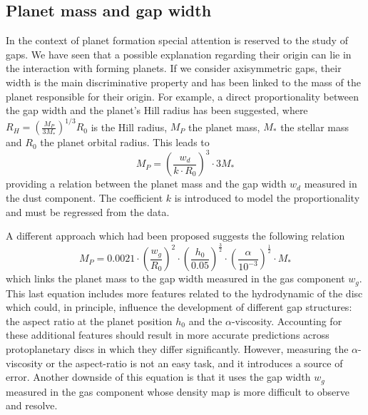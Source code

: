 \documentclass[a4paper,10pt]{report}
\begin{document}
\subsection{Planet mass and gap width}

In the context of planet formation special attention is reserved to the study of gaps. 
We have seen that a possible explanation regarding their origin can lie in the interaction with
forming planets. If we consider axisymmetric gaps, their width is the main discriminative property and
has been linked to the mass of the planet responsible for their origin.
For example, a direct proportionality between the gap width and the planet's Hill radius has been suggested, where
$
    R_H = (\frac{M_P}{3M_*})^{1/3}R_0
$
is the Hill radius, $M_P$ the planet mass, $M_*$ the stellar mass and $R_0$ the planet orbital radius.
This leads to 
\begin{equation}
    M_P = (\frac{w_d}{k\cdot R_0})^3\cdot 3M_*
\end{equation}
providing a relation between the planet mass and the gap width $w_d$ measured in the dust component.
The coefficient $k$ is introduced to model the proportionality and must be regressed from the data.

A different approach which had been proposed suggests the following relation
\begin{equation}
    M_P = 0.0021 \cdot \left( \frac{w_g}{R_0}\right)^2
    \cdot \left(\frac{h_0}{0.05}\right)^{\frac 32}
    \cdot \left(\frac{\alpha}{10^{-3}}\right)^{\frac 12}
    \cdot M_*
\end{equation}
which links the planet mass to the gap width measured in the gas component $w_g$.
This last equation includes more features related to the hydrodynamic of the disc which could, in principle,
influence the development of different gap structures: the aspect ratio at the planet position
$h_0$ and the $\alpha$-viscosity. Accounting for these additional features should result in more accurate predictions
across protoplanetary discs in which they differ significantly. However, measuring the $\alpha$-viscosity or the aspect-ratio 
is not an easy task, and it introduces a source of error.
Another downside of this equation is that it uses the gap width $w_g$ measured in the gas component 
whose density map is more difficult to observe and resolve.
\end{document}
